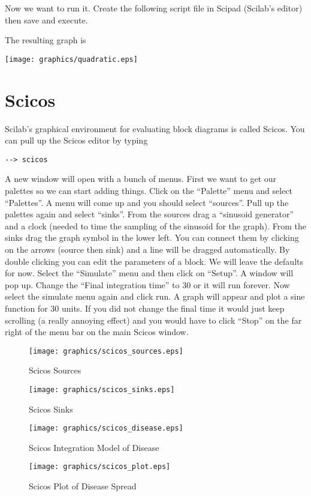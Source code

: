 Now we want to run it.  Create the following script file in Scipad (Scilab's editor) then save and execute.


The resulting graph is

\texttt{[image: graphics/quadratic.eps]}


\section{Scicos}

Scilab's graphical environment for evaluating block diagrams is called Scicos.  You can pull up the Scicos editor by typing
\begin{verbatim}
--> scicos
\end{verbatim}
A new window will open with a bunch of menus.  First we want to get our palettes so we can start adding things.  Click on the ``Palette'' menu and select ``Palettes''.  A menu will come up and you should select ``sources''.  Pull up the palettes again and select ``sinks''.  From the sources drag a ``sinusoid generator'' and a clock (needed to time the sampling of the sinusoid for the graph).  From the sinks drag the graph symbol in the lower left.  You can connect them by clicking on the arrows (source then sink) and a line will be dragged automatically.  By double clicking you can edit the parameters of a block.  We will leave the defaults for now.  Select the ``Simulate'' menu and then click on ``Setup''.  A window will pop up.  Change the ``Final integration time'' to 30 or it will run forever.  Now select the simulate menu again and click run.  A graph will appear and plot a sine function for 30 units.  If you did not change the final time it would just keep scrolling (a really annoying effect) and you would have to click ``Stop'' on the far right of the menu bar on the main Scicos window.

\begin{figure}
\caption{Scicos Sources}
\texttt{[image: graphics/scicos\_sources.eps]}
\end{figure}

\begin{figure}
\caption{Scicos Sinks}
\texttt{[image: graphics/scicos\_sinks.eps]}
\end{figure}

\begin{figure}
\caption{Scicos Integration Model of Disease}
\texttt{[image: graphics/scicos\_disease.eps]}
\end{figure}

\begin{figure}
\caption{Scicos Plot of Disease Spread}
\texttt{[image: graphics/scicos\_plot.eps]}
\end{figure}

